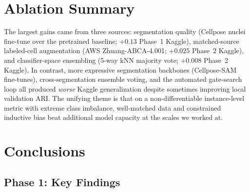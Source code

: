 \documentclass[a4paper,11pt]{article}
\begin{document}
\section{Ablation Summary}

The largest gains came from three sources: segmentation quality (Cellpose nuclei fine-tune over the pretrained baseline; $+0.13$ Phase~1 Kaggle), matched-source labeled-cell augmentation (AWS Zhuang-ABCA-4.001; $+0.025$ Phase~2 Kaggle), and classifier-space ensembling (5-way kNN majority vote; $+0.008$ Phase~2 Kaggle). In contrast, more expressive segmentation backbones (Cellpose-SAM fine-tunes), cross-segmentation ensemble voting, and the automated gate-search loop all produced \emph{worse} Kaggle generalization despite sometimes improving local validation ARI. The unifying theme is that on a non-differentiable instance-level metric with extreme class imbalance, well-matched data and constrained inductive bias beat additional model capacity at the scales we worked at.

\section{Conclusions}

\subsection{Phase 1: Key Findings}
\end{document}
